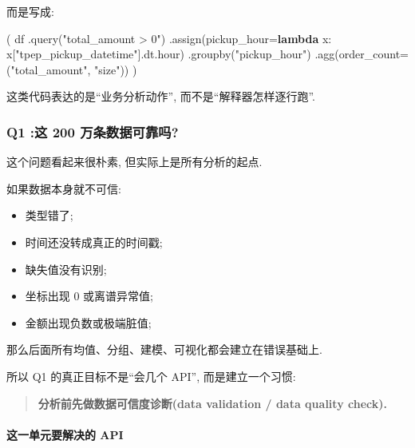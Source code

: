 \documentclass[11pt]{article}
\providecommand{\tightlist}{%
      \setlength{\itemsep}{0pt}\setlength{\parskip}{0pt}}
\newenvironment{Shaded}{}{}
\newcommand{\KeywordTok}[1]{\textcolor[rgb]{0.00,0.44,0.13}{\textbf{{#1}}}}
\newcommand{\StringTok}[1]{\textcolor[rgb]{0.25,0.44,0.63}{{#1}}}
\newcommand{\NormalTok}[1]{{#1}}
\newcommand{\OperatorTok}[1]{\textcolor[rgb]{0.40,0.40,0.40}{{#1}}}
\begin{document}
而是写成:

\begin{Shaded}
\begin{Highlighting}[]
\NormalTok{(}
\NormalTok{    df}
\NormalTok{    .query(}\StringTok{"total\_amount \textgreater{} 0"}\NormalTok{)}
\NormalTok{    .assign(pickup\_hour}\OperatorTok{=}\KeywordTok{lambda}\NormalTok{ x: x[}\StringTok{"tpep\_pickup\_datetime"}\NormalTok{].dt.hour)}
\NormalTok{    .groupby(}\StringTok{"pickup\_hour"}\NormalTok{)}
\NormalTok{    .agg(order\_count}\OperatorTok{=}\NormalTok{(}\StringTok{"total\_amount"}\NormalTok{, }\StringTok{"size"}\NormalTok{))}
\NormalTok{)}
\end{Highlighting}
\end{Shaded}

这类代码表达的是``业务分析动作'', 而不是``解释器怎样逐行跑''.

    \subsubsection{Q1 :这 200
万条数据可靠吗?}\label{q1-ux8fd9-200-ux4e07ux6761ux6570ux636eux53efux9760ux5417}

    这个问题看起来很朴素, 但实际上是所有分析的起点.

如果数据本身就不可信:

\begin{itemize}
\tightlist
\item
  类型错了;
\item
  时间还没转成真正的时间戳;
\item
  缺失值没有识别;
\item
  坐标出现 0 或离谱异常值;
\item
  金额出现负数或极端脏值;
\end{itemize}

那么后面所有均值、分组、建模、可视化都会建立在错误基础上.

所以 Q1 的真正目标不是``会几个 API'', 而是建立一个习惯:

\begin{quote}
\textbf{分析前先做数据可信度诊断(data validation / data quality check).}
\end{quote}

    \paragraph{这一单元要解决的
API}\label{ux8fd9ux4e00ux5355ux5143ux8981ux89e3ux51b3ux7684-api}
\end{document}
